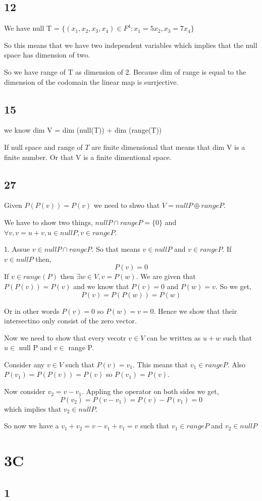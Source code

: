 \documentclass[a4paper]{report}
\begin{document}
\subsection*{12}

We have null T = $\{(x_1,x_2,x_3,x_4) \in F^4 : x_1 = 5x_2, x_3 = 7x_4\}$

So this means that we have two independent variables which implies that the null space has dimension of two. 

So we have range of T as dimension of 2. Because dim of range is equal to the dimension of the codomain the linear map is surrjective.

\subsection*{15}

we know dim V = dim (null(T)) + dim (range(T))

If null space and range of $T$ are finite dimensional that means that dim V is a finite number. Or that V is a finite dimentional space.


\subsection*{27}
Given $P(P(v)) = P(v)$ we need to shwo that $V = null P \oplus range P$.

We have to show two things, $null P \cap range P = \{0\}$ and  $\forall v, v = u + v, u \in null P, v \in range P$.

1. Assue  $v \in null P \cap range P$. So that means $v \in null P $ and  $v \in range P$. If $v \in null P$ then, 
$$ P(v) = 0 $$
If $v \in range(P)$ then $\exists w\in V, v = P(w)$. We are given that $P(P(v)) = P(v)$ and we know that $P(v) = 0$ and $P(w) = v$. So we get,  
$$P(v) = P(P(w)) = P(w)$$

Or in other words $P(v) = 0 $ so  $P(w) = v = 0$. Hence we show that their intersectino only consist of the zero vector.

Now we need to show that every vecotr $v \in V$ can be written as $u + w$ such that $u \in $ null P and $v \in $ range P.

Consider  any $v \in V$ such that $P(v) = v_1$. This means that $v_1 \in range P$. Also $P(v_1) = P(P(v)) = P(v)$ so $P(v_1) = P(v)$.

Now consider $v_2 = v - v_1$. Appling the operator on both sides we get, 
$$ P(v_2) = P(v - v_1) = P(v) - P(v_1) = 0 $$  which implies that $v_2 \in null P$.

So now we have a $v_1 + v_2 = v - v_1 + v_1 = v$  such that $v_1 \in range P$ and $v_2 \in null P$


\section*{3C}
\subsection*{1}
\end{document}
